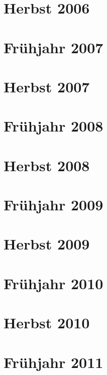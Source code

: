 \documentclass{lehramt-informatik-examen-sammlung}
\begin{document}
\section{Herbst 2006}


\section{Frühjahr 2007}


\section{Herbst 2007}


\section{Frühjahr 2008}


\section{Herbst 2008}


\section{Frühjahr 2009}


\section{Herbst 2009}


\section{Frühjahr 2010}


\section{Herbst 2010}


\section{Frühjahr 2011}

\end{document}
